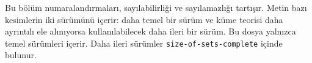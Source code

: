 
\begin{editorial}
Bu bölüm numaralandırmaları, sayılabilirliği ve sayılamazlığı tartışır.
Metin bazı kesimlerin iki sürümünü içerir: daha temel bir sürüm ve küme
teorisi daha ayrıntılı ele alınıyorsa kullanılabilecek daha ileri bir sürüm.
Bu dosya yalnızca temel sürümleri içerir. Daha ileri sürümler
\verb|size-of-sets-complete| içinde bulunur.
\end{editorial}
\OLEndChapterHook
